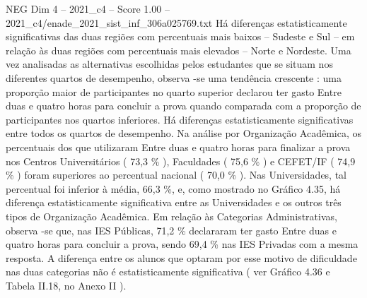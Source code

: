 \begin{textsample}{NEG Dim 4 – 2021\_c4 – Score 1.00 – 2021\_c4/enade\_2021\_sist\_inf\_306a025769.txt}
Há diferenças estatisticamente significativas das duas regiões com percentuais mais baixos – Sudeste e Sul – em relação às duas regiões com percentuais mais elevados – Norte e Nordeste.
Uma vez analisadas as alternativas escolhidas pelos estudantes que se situam nos diferentes quartos de desempenho, observa -se uma tendência crescente : uma proporção maior de participantes no quarto superior declarou ter gasto Entre duas e quatro horas para concluir a prova quando comparada com a proporção de participantes nos quartos inferiores.
Há diferenças estatisticamente significativas entre todos os quartos de desempenho.
Na análise por Organização Acadêmica, os percentuais dos que utilizaram Entre duas e quatro horas para finalizar a prova nos Centros Universitários ( 73,3 \% ), Faculdades ( 75,6 \% ) e CEFET/IF ( 74,9 \% ) foram superiores ao percentual nacional ( 70,0 \% ).
Nas Universidades, tal percentual foi inferior à média, 66,3 \%, e, como mostrado no Gráfico 4.35, há diferença estatisticamente significativa entre as Universidades e os outros três tipos de Organização Acadêmica.
Em relação às Categorias Administrativas, observa -se que, nas IES Públicas, 71,2 \% declararam ter gasto Entre duas e quatro horas para concluir a prova, sendo 69,4 \% nas IES Privadas com a mesma resposta.
A diferença entre os alunos que optaram por esse motivo de dificuldade nas duas categorias não é estatisticamente significativa ( ver Gráfico 4.36 e Tabela II.18, no Anexo II ).

\end{textsample}
